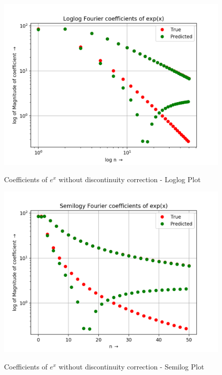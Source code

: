 \documentclass[11pt, a4paper]{article}
\begin{document}
\begin{figure}[H]
   	\centering
   	\includegraphics[scale=0.5]{loglog1e.png}
   	\label{fig:loglog1e}
   	\caption{Coefficients of $e^{x}$ without discontinuity correction - Loglog Plot}
\end{figure}
\begin{figure}[H]
   	\centering
   	\includegraphics[scale=0.5]{semilog1e.png}
   	\label{fig:semilog1e}
   	\caption{Coefficients of $e^{x}$ without discontinuity correction - Semilog Plot}
\end{figure}
\end{document}
